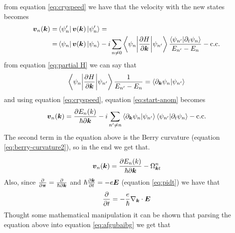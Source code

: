 from equation \ref{eq:cryspeed} we have that the velocity with the new states becomes 
\begin{equation}
    \begin{split}
        \boldsymbol{v}_n(\boldsymbol{k})=&\bra{\psi'_n}\boldsymbol{v}(\boldsymbol{k})\ket{\psi'_n}=\\
        =&\bra{\psi_n}\boldsymbol{v}(\boldsymbol{k})\ket{\psi_n} -i\sum _{n\neq 0}
        \braket{\psi_n\bigg|\frac{\partial H}{\partial \boldsymbol{k} }}{\psi_{n'}}
        \frac{\braket{\psi_{n'}}{\partial_t\psi_n}}{E_{n'}-E_n} - \textrm {c.c.}
    \end{split}
    \label{eq:start-anom}
\end{equation}
from equation \ref{eq:partial H} we can say that
\begin{equation}
    \braket{\psi_n\bigg|\frac{\partial H}{\partial \boldsymbol{k} }}{\psi_{n'}}\frac1{E_{n'}-E_n}=\braket{\partial_{\boldsymbol{k}}\psi_n}{\psi_{n'}}
\end{equation}
and using equation \ref{eq:cryspeed}, equation \ref{eq:start-anom} becomes
\begin{equation}
    \boldsymbol{v}_n(\boldsymbol{k})=\frac{\partial E_n (k)}{\hbar\partial \boldsymbol{k}} -i
    \sum_{n'\neq n}
    \braket{\partial_{\boldsymbol{k}}\psi_n}{\psi_{n'}}
    \braket{\psi_{n'}}{\partial_t\psi_n}
    -\textrm{c.c.}
\end{equation}
The second term in the equation above is the Berry curvature (equation \ref{eq:berry-curvature2}), so in the end we get that.

\begin{equation}
    \boldsymbol{v}_n(\boldsymbol{k})=\frac{\partial E_n (k)}{\hbar\partial \boldsymbol{k}} -\Omega^n_{\boldsymbol{k}t}
    \label{eq:afgubaibg}
\end{equation}
Also, since $\frac{\partial}{\partial \boldsymbol{\pi}}=\frac \partial{\hbar\partial \boldsymbol{k}}$ and $\hbar\frac{\partial \boldsymbol{k}}{\partial t}=-e\boldsymbol{E}$ (equation \ref{eq:pidt})
we have that
\[
    \frac{\partial }{\partial t}=-\frac e\hbar \nabla_{\boldsymbol{k}}\cdot \boldsymbol{E}    
\]
Thought some mathematical manipulation it can be shown that parsing the equation above into equation \ref{eq:afgubaibg} we get that  \cite{chang1995berry}

